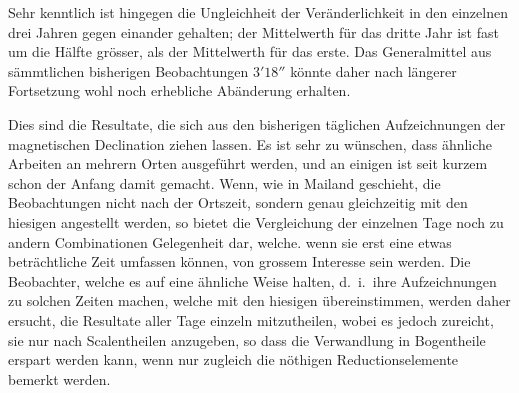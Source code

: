 Sehr kenntlich ist hingegen die Ungleichheit der Veränderlichkeit in den einzelnen drei Jahren gegen einander gehalten; der Mittelwerth für das dritte Jahr ist fast um die Hälfte grösser, als der Mittelwerth für das erste. Das Generalmittel aus sämmtlichen bisherigen Beobachtungen $3'18''$ könnte daher nach längerer Fortsetzung wohl noch erhebliche Abänderung erhalten.

Dies sind die Resultate, die sich aus den bisherigen täglichen Aufzeichnungen der magnetischen Declination ziehen lassen. Es ist sehr zu wünschen, dass ähnliche Arbeiten an mehrern Orten ausgeführt werden, und an einigen ist seit kurzem schon der Anfang damit gemacht. Wenn, wie in Mailand geschieht, die Beobachtungen nicht nach der Ortszeit, sondern genau gleichzeitig mit den hiesigen angestellt werden, so bietet die Vergleichung der einzelnen Tage noch zu andern Combinationen Gelegenheit dar, welche. wenn sie erst eine etwas beträchtliche Zeit umfassen können, von grossem Interesse sein werden. Die Beobachter, welche es auf eine ähnliche Weise halten, d.\ i.\ ihre Aufzeichnungen zu solchen Zeiten machen, welche mit den hiesigen übereinstimmen, werden daher ersucht, die Resultate aller Tage einzeln mitzutheilen, wobei es jedoch zureicht, sie nur nach Scalentheilen anzugeben, so dass die Verwandlung in Bogentheile erspart werden kann, wenn nur zugleich die nöthigen Reductionselemente bemerkt werden.

